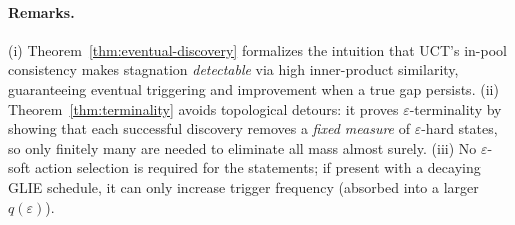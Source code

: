 \paragraph{Remarks.}
(i) Theorem~\ref{thm:eventual-discovery} formalizes the intuition that UCT’s in-pool consistency makes stagnation \emph{detectable} via high inner-product similarity, guaranteeing eventual triggering and improvement when a true gap persists.
(ii) Theorem~\ref{thm:terminality} avoids topological detours: it proves $\varepsilon$-terminality by showing that each successful discovery removes a \emph{fixed measure} of $\varepsilon$-hard states, so only finitely many are needed to eliminate all mass almost surely.
(iii) No $\varepsilon$-soft action selection is required for the statements; if present with a decaying GLIE schedule, it can only increase trigger frequency (absorbed into a larger $q(\varepsilon)$).
